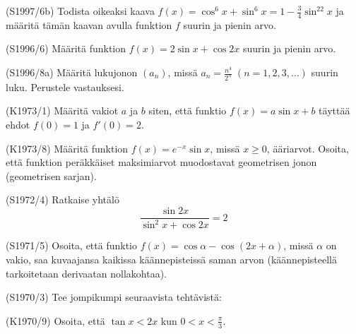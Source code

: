 \begin{tehtava} (S1997/6b)
	Todista oikeaksi kaava $f(x)=\cos^6x+\sin^6x=1-\frac{3}{4}\sin^22x$ ja määritä tämän kaavan avulla funktion $f$ 
	suurin ja pienin arvo.
\end{tehtava}

\begin{tehtava} (S1996/6)
	Määritä funktion $f(x)=2\sin x+\cos2x$ suurin ja pienin arvo.
\end{tehtava}

\begin{tehtava} (S1996/8a)
	Määritä lukujonon $(a_n)$, missä $a_n=\frac{n^4}{2^n} \; (n=1,2,3,\ldots)$ suurin luku. Perustele vastauksesi.
\end{tehtava}

\begin{tehtava} (K1973/1)
	Määritä vakiot $a$ ja $b$ siten, että funktio $f(x)=a\sin x+b$ täyttää ehdot $f(0)=1$ ja $f'(0)=2$.
\end{tehtava}

\begin{tehtava} (K1973/8)
	Määritä funktion $f(x)=e^{-x}\sin x$, missä $x\geq0$, ääriarvot. Osoita, että funktion peräkkäiset maksimiarvot muodostavat 
	geometrisen jonon (geometrisen sarjan).
\end{tehtava}

\begin{tehtava} (S1972/4)
	Ratkaise yhtälö \[\frac{\sin2x}{\sin^2x+\cos2x}=2\]
\end{tehtava}

\begin{tehtava} (S1971/5)
	Osoita, että funktio $f(x)=\cos\alpha-\cos(2x+\alpha)$, missä $\alpha$ on vakio, saa kuvaajansa kaikissa käännepisteissä 
	saman arvon (käännepisteellä tarkoitetaan derivaatan nollakohtaa).
\end{tehtava}

\begin{tehtava} (S1970/3)
	Tee jompikumpi seuraavista tehtävistä:
		\begin{alakohdat}
		\end{alakohdat}
\end{tehtava}

\begin{tehtava} (K1970/9)
	Osoita, että $\tan x<2x$ kun $0<x<\frac{\pi}{3}$.
\end{tehtava}







